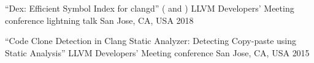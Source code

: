 
\begin{cventries}

  \cventry
    {``Dex: Efficient Symbol Index for clangd''
     ( and
      )}
    {LLVM Developers' Meeting conference lightning talk}
    {San Jose, CA, USA}
    {2018}
    {}

  \cventry
    {``Code Clone Detection in Clang Static Analyzer: Detecting Copy-paste using
     Static Analysis''}
    {LLVM Developers' Meeting conference }
    {San Jose, CA, USA}
    {2015}
    {}

\end{cventries}
